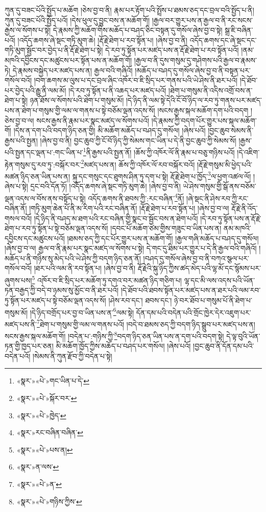 ཀུན་དུ་བཟང་པོའི་སྤྱོད་པ་མཆོག །ཅེས་བྱ་བ་ནི། རྣམ་པར་རྟོག་པའི་སྤྲོས་པ་ཐམས་ཅད་དང་བྲལ་བའི་སྤྱོད་པ་ནི། ཀུན་དུ་བཟང་པོའི་སྤྱོད་པའོ། །དེས་ཕུལ་དུ་བྱུང་བས་ན་མཆོག་གོ། །རྒྱལ་བར་གྱུར་པས་ན་རྒྱལ་བ་ནི་རང་སངས་རྒྱས་ལ་སོགས་པ་སྟེ། དེ་རྣམས་ཀྱི་མཆོག་གིས་མཆོད་པ་བཤད་ཅིང་བསྟན་དུ་གསོལ་ཞེས་བྱ་བ་སྟེ། སྒྲ་ཇི་བཞིན་པའོ། །འདོད་ཆགས་ཞེ་སྡང་གཏི་མུག་ཆེ། །རྡོ་རྗེ་ཐེག་པ་རབ་སྟོན་པ། །ཞེས་བྱ་བ་ནི། འདོད་ཆགས་དང་ཞེ་སྡང་དང་གཏི་མུག་སྦྱོང་བར་བྱེད་པ་ནི་རྡོ་རྗེ་ཐེག་པ་སྟེ། དེ་རབ་ཏུ་སྟོན་པར་མཛད་པས་ན་རྡོ་རྗེ་ཐེག་པ་རབ་སྟོན་པའོ། །ནམ་མཁའི་དབྱིངས་དང་མཚུངས་པར་སྟོན་པས་ན་མཆོག་གོ། །རྒྱལ་བ་ནི་དུས་གསུམ་དུ་གཤེགས་པའི་རྒྱལ་བ་རྣམས་ཏེ། དེ་རྣམས་བསྐྱེད་པར་མཛད་པས་ན། རྒྱལ་བའི་གཞིའོ། །མཆོད་པ་བཤད་དུ་གསོལ་ཞེས་བྱ་བ་ནི་བསྟན་པར་གསོལ་བའོ། །བག་ཆགས་མ་ལུས་པ་དང་བྲལ་ཞིང་འཁོར་བ་ཇི་སྲིད་པར་གནས་པའི་ཡེ་ཤེས་ནི་ཐར་པའོ། །དེ་ཐོབ་པར་བྱེད་པའི་རྒྱུ་ནི་ལམ་མོ། །དེ་རབ་ཏུ་སྟོན་པ་ནི་འཆད་པར་མཛད་པའོ། །ཐེག་པ་གསུམ་ནི་འདིས་འགྲོ་བས་ན་ཐེག་པ་སྟེ། ཉན་ཐོས་ལ་སོགས་པའི་ཐེག་པ་གསུམ་མོ། །དེ་ཉིད་ནི་ལམ་སྟེ་དེའི་ངོ་བོ་ཉིད་ལ་རབ་ཏུ་གནས་པར་མཛད་པས་ན་ཐེག་པ་གསུམ་གྱི་ལམ་ལ་གནས་པ་སྟེ་བཅོམ་ལྡན་འདས་སོ། །སངས་རྒྱས་སྐལ་མཆོག་དག་པའི་བདག །ཅེས་བྱ་བ་ལ། སངས་རྒྱས་ནི་རྣམ་པར་སྣང་མཛད་ལ་སོགས་པའོ། །དེ་རྣམས་ཀྱི་བདག་པོར་གྱུར་པས་སྐལ་མཆོག་གོ། །དེས་ན་དག་པའི་བདག་ཉིད་ཅན་གྱི། མི་མཆོག་མཆོད་པ་བཤད་དུ་གསོལ། །ཞེས་པའོ། །བྱང་ཆུབ་སེམས་ནི་རྒྱས་པའི་སྤྱན། །ཞེས་བྱ་བ་ནི། བྱང་ཆུབ་ཀྱི་ངོ་བོ་ཉིད་ཀྱི་སེམས་གང་ཡིན་པ་དེ་ནི་བྱང་ཆུབ་ཀྱི་སེམས་སོ། །རྒྱས་པའི་སྤྱན་དང་ལྡན་པ་:གང་ཡིན་པ་\footnote{«སྣར་»«པེ་»གང་ཡིན་པ་དེ་}ནི་རྒྱས་པའི་སྤྱན་ནོ། །ཆོས་ཀྱི་འཁོར་ལོ་ནི་རྣམ་པ་བཅུ་གཉིས་པའོ། །དེ་འཇིག་རྟེན་གསུམ་དུ་རབ་ཏུ་:བསྐོར་བར་\footnote{«སྣར་»«པེ་»སྐོར་བར་}མཛད་པས་ན། ཆོས་ཀྱི་འཁོར་ལོ་རབ་བསྐོར་བའོ། །རྡོ་རྗེ་གསུམ་མི་ཕྱེད་པའི་མཚན་ཉིད་ཅན་ཡིན་པས་ན། སྐུ་དང་གསུང་དང་ཐུགས་ཤིན་ཏུ་དག་པ་སྟེ། རྡོ་རྗེ་ཐེག་པ་ཁྱོད་\footnote{«སྣར་»«པེ་»ཁྱེད་}ལ་ཕྱག་འཚལ་ལོ། །ཞེས་པ་སྟེ། དྲང་བའི་དོན་ཏོ། །འདོད་ཆགས་ཞེ་སྡང་གཏི་མུག་ཆེ། །ཞེས་བྱ་བ་ནི། ཡེ་ཤེས་གསུམ་གྱི་སྒོ་ནས་བཅོམ་ལྡན་འདས་ལ་བོས་ནས་བསྟོད་པ་སྟེ། འདོད་ཆགས་ནི་ཐབས་ཀྱི་:རང་བཞིན་\footnote{«སྣར་»རང་བཞིན་བཞིན་}ནོ། །ཞེ་སྡང་ནི་ཤེས་རབ་ཀྱི་རང་བཞིན་ནོ། །གཏི་མུག་ཆེན་པོ་ནི་མ་རིག་པའི་རང་བཞིན་ནོ། །རྡོ་རྗེ་ཐེག་པ་རབ་སྟོན་པ། །ཞེས་བྱ་བ་ལ། རྡོ་རྗེ་ནི་འོད་གསལ་བའོ། །དེ་ཉིད་ནི་བཤད་མ་ཐག་པའི་རང་བཞིན་གྱི་སྣང་བ་སྦྱོང་བས་ན་ཐེག་པའོ། །དེ་རབ་ཏུ་སྟོན་པས་ན་རྡོ་རྗེ་ཐེག་པ་རབ་ཏུ་སྟོན་པ་སྟེ་བཅོམ་ལྡན་འདས་སོ། །དབང་པོ་མཆོག་ཙམ་གྱིས་གཟུང་བ་ཡིན་པས་ན། ནམ་མཁའི་དབྱིངས་དང་མཚུངས་པའོ། །ཐམས་ཅད་ཀྱི་དང་པོར་གྱུར་པས་ན་མཆོག་གོ། །རྒྱལ་གཞི་མཆོད་པ་བཤད་དུ་གསོལ། །ཞེས་བྱ་བ་ལ། རྒྱལ་བ་ནི་རྣམ་པར་སྣང་མཛད་ལ་སོགས་པ་སྟེ། དེ་གང་དུ་ཐིམ་པར་གྱུར་པ་དེ་ནི་རྒྱལ་བའི་གཞིའོ། །མཆོད་པ་ནི་གཉིས་སུ་མེད་པའི་ཡེ་ཤེས་ཀྱི་བདག་ཉིད་ཅན་ནོ། །བཤད་དུ་གསོལ་ཞེས་བྱ་བ་ནི་བཀའ་སྩལ་པར་གསོལ་བའོ། །ཐར་པའི་ལམ་ནི་རབ་སྟོན་པ། །ཞེས་བྱ་བ་ནི། རྡོ་རྗེའི་སྐུ་ཉིད་ཀྱིས་ཚད་མེད་པའི་ལྷ་མོ་དང་སྙོམས་པར་ཞུགས་པས།\footnote{«སྣར་»«པེ་»པས་ན།} འཁོར་བ་ཇི་སྲིད་པར་མཆོག་ཏུ་དགའ་བར་མཚན་ཉིད་གཅིག་པ། ལྷ་དང་མི་ལས་འདས་པའི་ཡོན་ཏན་བརྒྱད་ཀྱི་བདེ་བ་ཉམས་སུ་མྱོང་བ་ནི་ཐར་པའོ། །དེ་ཐོབ་པའི་ཐབས་སྟོན་པར་མཛད་པས་ན་ཐར་པའི་ལམ་རབ་ཏུ་སྟོན་པར་མཛད་པ་སྟེ་བཅོམ་ལྡན་འདས་སོ། །ཤེས་རབ་དང་། ཐབས་དང་། ཉེ་བར་ཐོབ་པ་གསུམ་པོ་ནི་ཐེག་པ་གསུམ་མོ། །དེ་ཉིད་བགྲོད་པར་བྱ་བ་ཡིན་པས་ན་\footnote{«སྣར་»ན་ལས་}ལམ་སྟེ། དོན་དམ་པའི་བདེན་པའི་གྲོང་ཁྱེར་དེར་འཇུག་པར་མཛད་པས་ནི་\footnote{«སྣར་»«པེ་»ན་}ཐེག་པ་གསུམ་གྱི་ལམ་ལ་གནས་པའོ། །བདེ་བ་ཐམས་ཅད་ཀྱི་བདག་ཉིད་སྒྲུབ་པར་མཛད་པས་ན། སངས་རྒྱས་སྐལ་མཆོག་གོ། །བདེན་པ་:གཉིས་ཀྱི་\footnote{«སྣར་»«པེ་»གཉིས་ཀྱིས་}བདག་ཉིད་ཅན་ཡིན་པས་ན་དག་པའི་བདག་སྟེ། དེ་ལྟ་བུའི་ཡོན་ཏན་གྱི་ཁྱད་པར་ཅན། མི་མཆོག་ཁྱོད་ཀྱིས་མཆོད་པ་བཤད་པར་གསོལ། །ཞེས་པའོ། །བྱང་ཆུབ་ནི་དོན་དམ་པའི་བདེན་པའོ། །སེམས་ནི་ཀུན་རྫོབ་ཀྱི་བདེན་པ་སྟེ། 